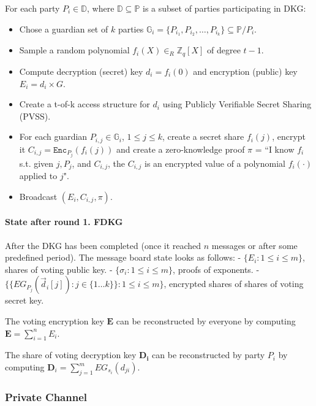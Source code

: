 \documentclass{article}
\begin{document}
For each party $P_i \in \mathbb{D}$, where $\mathbb{D} \subseteq  \mathbb{P}$ is a subset of parties participating in DKG:
\begin{itemize}
    \item Chose a guardian set of $k$ parties  $\mathbb{G}_i=\{P_{i_1},P_{i_2},\dots,P_{i_k}\}\subseteq \mathbb{P}/P_i$.
    \item Sample a random polynomial $f_{i}(X) \in_R \mathbb{Z}_q[X]$ of degree $t-1$.
    \item Compute decryption (secret) key $d_{i}= f_i(0)$ and encryption (public) key $E_{i} = d_i \times G$.
    \item Create a t-of-k access structure for $d_i$ using Publicly Verifiable Secret Sharing (PVSS).
    \item For each guardian $P_{i,j} \in \mathbb{G}_i$, $1 \leq j \leq k$, create a secret share $f_i(j)$, encrypt it $C_{i,j}=\texttt{Enc}_{P_j}(f_i(j))$ and create a zero-knowledge proof $\pi$ = “I know $f_i$ s.t. given $j, P_j$, and $C_{i,j}$, the $C_{i,j}$ is an encrypted value of a polynomial $f_i(\cdot)$ applied to $j$".
    \item Broadcast $(E_i,C_{i,j}, \pi)$.
\end{itemize}

\paragraph*{State after round 1. FDKG}

After the DKG has been completed (once it reached $n$ messages or after some predefined period). The message board state looks as follows:
- $\{E_{i} : 1 \leq i \leq m\}$, shares of voting public key.
- $\{\sigma_{i} : 1 \leq i \leq m\}$, proofs of exponents.
- $\{\{EG_{P_{j}}(\vec{d}_{i}[j]) : j \in \{1\dots k\}\} : 1 \leq i \leq m \}$, encrypted shares of shares of voting secret key.

The voting encryption key $\textbf{E}$ can be reconstructed by everyone by computing $\mathbf{E}=\sum_{i=1}^{n} E_{i}$.

The share of voting decryption key $\mathbf{D_i}$ can be reconstructed by party $P_i$ by computing $\mathbf{D}_{i}=\sum_{j=1}^{m} EG_{s_{i}}(d_{ji})$.



\subsubsection{Private Channel}
\end{document}
